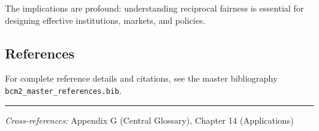 The implications are profound: understanding reciprocal fairness is essential for designing
effective institutions, markets, and policies.

\subsection{References}

For complete reference details and citations, see the master bibliography
\texttt{bcm2\_master\_references.bib}.

\vspace{1em}
\hrule
\vspace{0.5em}

\noindent\textit{Cross-references:}
Appendix G (Central Glossary), Chapter 14 (Applications)
